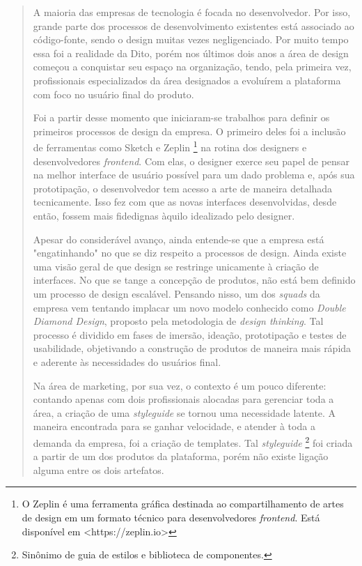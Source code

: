 \begin{quote}
    A maioria das empresas de tecnologia é focada no desenvolvedor. Por isso, grande parte dos processos de desenvolvimento existentes está associado ao código-fonte, sendo o design muitas vezes negligenciado. Por muito tempo essa foi a realidade da Dito, porém nos últimos dois anos a área de design começou a conquistar seu espaço na organização, tendo, pela primeira vez, profissionais especializados da área designados a evoluírem a plataforma com foco no usuário final do produto.
    
    Foi a partir desse momento que iniciaram-se trabalhos para definir os primeiros processos de design da empresa. O primeiro deles foi a inclusão de ferramentas como Sketch e Zeplin \footnote{O Zeplin é uma ferramenta gráfica destinada ao compartilhamento de artes de design em um formato técnico para desenvolvedores \textit{frontend}. Está disponível em <https://zeplin.io>} na rotina dos designers e desenvolvedores \textit{frontend}. Com elas, o designer exerce seu papel de pensar na melhor interface de usuário possível para um dado problema e, após sua prototipação, o desenvolvedor tem acesso a arte de maneira detalhada tecnicamente. Isso fez com que as novas interfaces desenvolvidas, desde então, fossem mais fidedignas àquilo idealizado pelo designer.
    
    Apesar do considerável avanço, ainda entende-se que a empresa está "engatinhando" no que se diz respeito a processos de design. Ainda existe uma visão geral de que design se restringe unicamente à criação de interfaces. No que se tange a concepção de produtos, não está bem definido um processo de design escalável. Pensando nisso, um dos \textit{squads} da empresa vem tentando implacar um novo modelo conhecido como \textit{Double Diamond Design}, proposto pela metodologia de \textit{design thinking}. Tal processo é dividido em fases de imersão, ideação, prototipação e testes de usabilidade, objetivando a construção de produtos de maneira mais rápida e aderente às necessidades do usuários final.
    
    Na área de marketing, por sua vez, o contexto é um pouco diferente: contando apenas com dois profissionais alocadas para gerenciar toda a área, a criação de uma \textit{styleguide} se tornou uma necessidade latente. A maneira encontrada para se ganhar velocidade, e atender à toda a demanda da empresa, foi a criação de templates. Tal \textit{styleguide} \footnote{Sinônimo de guia de estilos e biblioteca de componentes.} foi criada a partir de um dos produtos da plataforma, porém não existe ligação alguma entre os dois artefatos.
\end{quote}

